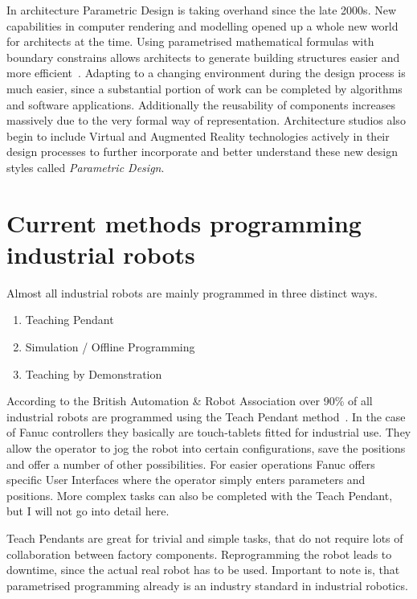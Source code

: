 In architecture Parametric Design is taking overhand since the late 2000s. New capabilities in computer rendering and modelling opened up a whole new world for architects at the time. Using parametrised mathematical formulas with boundary constrains allows architects to generate building structures easier and more efficient~\cite{stavric2011parametric}. Adapting to a changing environment during the design process is much easier, since a substantial portion of work can be completed by algorithms and software applications. Additionally the reusability of  components increases massively due to the very formal way of representation. Architecture studios also begin to include Virtual and Augmented Reality technologies actively in their design processes to further incorporate and better understand these new design styles called \textit{Parametric Design}. 


\section{Current methods programming industrial robots}
Almost all industrial robots are mainly programmed in three distinct ways.
\begin{enumerate}
	\setcounter{enumi}{0}
	\setlength\itemsep{-1em}
	\item Teaching Pendant
	\item Simulation / Offline Programming
	\item Teaching by Demonstration
\end{enumerate}

According to the British Automation \& Robot Association over 90\% of all industrial robots are programmed using the Teach Pendant method~\cite{bara}. In the case of Fanuc controllers they basically are touch-tablets fitted for industrial use. They allow the operator to jog the robot into certain configurations, save the positions and offer a number of other possibilities. For easier operations Fanuc offers specific User Interfaces where the operator simply enters parameters and positions. More complex tasks can also be completed with the Teach Pendant, but I will not go into detail here. 

Teach Pendants are great for trivial and simple tasks, that do not require lots of collaboration between factory components. Reprogramming the robot leads to downtime, since the actual real robot has to be used. Important to note is, that parametrised programming already is an industry standard in industrial robotics. 

